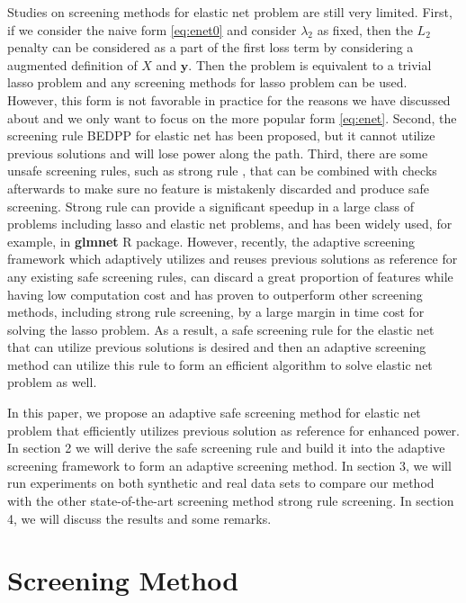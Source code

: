 Studies on screening methods for elastic net problem are still very limited. First, if we consider the naive form \eqref{eq:enet0} and consider $\lambda_2$ as fixed, then the $L_2$ penalty can be considered as a part of the first loss term by considering a augmented definition of $X$ and $\boldsymbol y$. Then the problem is equivalent to a trivial lasso problem and any screening methods for lasso problem can be used. However, this form is not favorable in practice for the reasons we have discussed about and we only want to focus on the more popular form \eqref{eq:enet}. Second, the screening rule BEDPP for elastic net \citep{Zeng2021} has been proposed, but it cannot utilize previous solutions and will lose power along the path. Third, there are some unsafe screening rules, such as strong rule \citep{Tibshirani2012}, that can be combined with checks afterwards to make sure no feature is mistakenly discarded and produce safe screening. Strong rule can provide a significant speedup in a large class of problems including lasso and elastic net problems, and has been widely used, for example, in \textbf{glmnet} R package. However, recently, the adaptive screening framework \citep{wang2021adaptive} which adaptively utilizes and reuses previous solutions as reference for any existing safe screening rules, can discard a great proportion of features while having low computation cost and has proven to outperform other screening methods, including strong rule screening, by a large margin in time cost for solving the lasso problem. As a result, a safe screening rule for the elastic net that can utilize previous solutions is desired and then an adaptive screening method can utilize this rule to form an efficient algorithm to solve elastic net problem as well.

In this paper, we propose an adaptive safe screening method for elastic net problem that efficiently utilizes previous solution as reference for enhanced power. In section 2 we will derive the safe screening rule and build it into the adaptive screening framework to form an adaptive screening method. In section 3, we will run experiments on both synthetic and real data sets to compare our method with the other state-of-the-art screening method strong rule screening. In section 4, we will discuss the results and some remarks.



\section{Screening Method}
